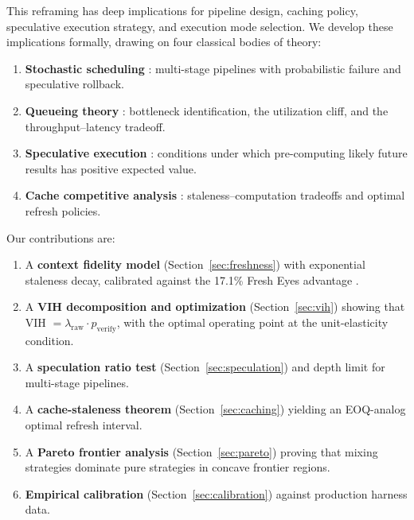 \documentclass[11pt,a4paper]{article}
\theoremstyle{definition}
\theoremstyle{remark}
\begin{document}
This reframing has deep implications for pipeline design, caching policy, speculative execution strategy, and execution mode selection. We develop these implications formally, drawing on four classical bodies of theory:

\begin{enumerate}[label=(\roman*)]
    \item \textbf{Stochastic scheduling} \citep{graham1966bounds, mohring1984stochastic, pinedo2016scheduling}: multi-stage pipelines with probabilistic failure and speculative rollback.
    \item \textbf{Queueing theory} \citep{little1961proof, kingman1961single, hopp2000factory}: bottleneck identification, the utilization cliff, and the throughput--latency tradeoff.
    \item \textbf{Speculative execution} \citep{tomasulo1967efficient, smith1981branch, yeh1991two}: conditions under which pre-computing likely future results has positive expected value.
    \item \textbf{Cache competitive analysis} \citep{belady1966replacement, sleator1985amortized, denning1968working}: staleness--computation tradeoffs and optimal refresh policies.
\end{enumerate}

\noindent Our contributions are:

\begin{enumerate}
    \item A \textbf{context fidelity model} (Section~\ref{sec:freshness}) with exponential staleness decay, calibrated against the 17.1\% Fresh Eyes advantage \citep{suzgun2024metaprompting}.
    \item A \textbf{VIH decomposition and optimization} (Section~\ref{sec:vih}) showing that VIH $= \lambda_{\mathrm{raw}} \cdot p_{\mathrm{verify}}$, with the optimal operating point at the unit-elasticity condition.
    \item A \textbf{speculation ratio test} (Section~\ref{sec:speculation}) and depth limit for multi-stage pipelines.
    \item A \textbf{cache-staleness theorem} (Section~\ref{sec:caching}) yielding an EOQ-analog optimal refresh interval.
    \item A \textbf{Pareto frontier analysis} (Section~\ref{sec:pareto}) proving that mixing strategies dominate pure strategies in concave frontier regions.
    \item \textbf{Empirical calibration} (Section~\ref{sec:calibration}) against production harness data.
\end{enumerate}
\end{document}
